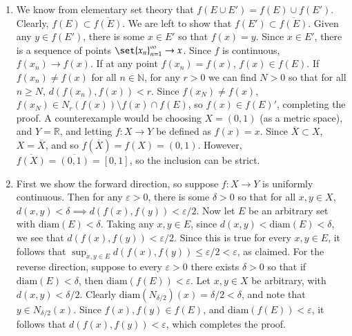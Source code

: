 \documentclass[12pt]{article}
\def\mbb#1{\mathbb{#1}}
\def\bN{\mbb{N}}
\def \R{\mbb{R}}
\def \ve{\varepsilon}
\theoremstyle{definition}
\theoremstyle{remark}
\begin{document}
\begin{enumerate}[leftmargin=\labelsep]
		\item We know from elementary set theory that $f(E \cup E') = f(E) \cup f(E')$. Clearly, $f(E) \subset \overline{f(E)}$. We are left to show that $f(E') \subset \overline{f(E)}$. Given any $y \in f(E')$, there is some $x \in E'$ so that $f(x) = y$. Since $x \in E'$, there is a sequence of points $\set{x_n}_{n=1}^\infty \to x$. Since $f$ is continuous, $f(x_n) \to f(x)$. If at any point $f(x_n) = f(x)$, $f(x) \in f(E)$. If $f(x_n) \neq f(x)$ for all $n \in \bN$, for any $r > 0$ we can find $N > 0$ so that for all $n \geq N$, $d(f(x_n), f(x)) < r$. Since $f(x_N) \neq f(x)$, $f(x_N) \in N_r(f(x)) \setminus f(x) \cap f(E)$, so $f(x) \in f(E)'$, completing the proof. A counterexample would be choosing $X = (0, 1)$ (as a metric space), and $Y = \R$, and letting $f: X \to Y$ be defined as $f(x) = x$. Since $\overline{X} \subset X$, $X = \overline{X}$, and so $f(\overline{X}) = f(X) = (0, 1)$. However, $\overline{f(X)} = \overline{(0, 1)} = [0, 1]$, so the inclusion can be strict.
		
		\item First we show the forward direction, so suppose $f: X \to Y$ is uniformly continuous. Then for any $\ve > 0$, there is some $\delta > 0$ so that for all $x, y \in X$, $d(x,y) < \delta \implies d(f(x), f(y)) < \ve/2$. Now let $E$ be an arbitrary set with $\mathrm{diam}(E) < \delta$. Taking any $x, y \in E$, since $d(x, y) < \mathrm{diam}(E) < \delta$, we see that $d(f(x), f(y)) < \ve/2$. Since this is true for every $x, y \in E$, it follows that $\sup_{x,y \in E} d(f(x), f(y)) \leq \ve/2 < \ve$, as claimed. For the reverse direction, suppose to every $\ve > 0$ there exists $\delta > 0$ so that if $\mathrm{diam}(E) < \delta$, then $\mathrm{diam}(f(E)) < \ve$. Let $x, y \in X$ be arbitrary, with $d(x, y) < \delta/2$. Clearly $\mathrm{diam}(N_{\delta/2})(x) = \delta/2 < \delta$, and note that $y \in N_{\delta/2}(x)$. Since $f(x), f(y) \in f(E)$, and $\mathrm{diam}(f(E)) < \ve$, it follows that $d(f(x), f(y)) < \ve$, which completes the proof.
	\end{enumerate}
\end{document}

